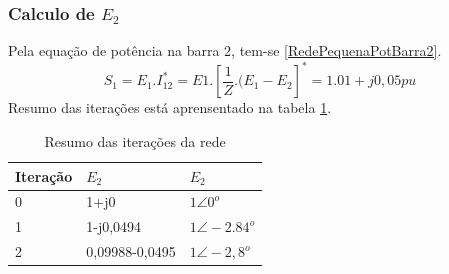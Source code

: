 \subsubsection{Calculo de $E_2$}
Pela equação de potência na barra $2$, tem-se \ref{RedePequenaPotBarra2}.
\begin{equation}
    S_1 = E_1.I^*_12=E1.[\frac{1}{Z}.(E_1-E_2]^*= 1.01+j0,05pu
    \label{RedePequenaPotBarra2}
\end{equation}
Resumo das iterações está aprensentado na tabela \ref{t_redePequenaResumo}.
\begin{table}[!htb]
\centering
\caption{Resumo das iterações da rede}
\begin{tabular}{lll}
\hline
Iteração & $E_2$          & $E_2$ \\ \hline
0        & 1+j0           & $1\angle 0^o$ \\
1        & 1-j0,0494      & $1 \angle -2.84^o$ \\
2        & 0,09988-0,0495 & $1 \angle -2,8^o$ \\ \hline
\end{tabular}
\label{t_redePequenaResumo}
\end{table}


